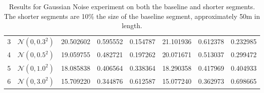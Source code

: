 \begin{table}[ht]
\begin{tabular}{l l | C{2.2} C{1.3} C{1.3} | C{2.2} C{1.3} C{1.3}}
3 & $\mathcal{N}(0, 0.3^2)$ & 20.502602 & 0.595552 & 0.154787 & 21.101936 & 0.612378 & 0.232985 \\ 
4 & $\mathcal{N}(0, 0.5^2)$ & 19.059755 & 0.482721 & 0.197262 & 20.071671 & 0.513037 & 0.299472 \\ 
5 & $\mathcal{N}(0, 1.0^2)$ & 18.085838 & 0.406564 & 0.338364 & 18.290358 & 0.417969 & 0.404933 \\ 
6 & $\mathcal{N}(0, 3.0^2)$ & 15.709220 & 0.344876 & 0.612587 & 15.077240 & 0.362973 & 0.698665 \\ 
\hline
\end{tabular}
\caption{Results for Gaussian Noise experiment on both the baseline and shorter segments. The shorter segments are 10\% the size of the baseline segment, approximately 50m in length.}
\label{tab:exp-gaussian-noise-full}
\end{table}